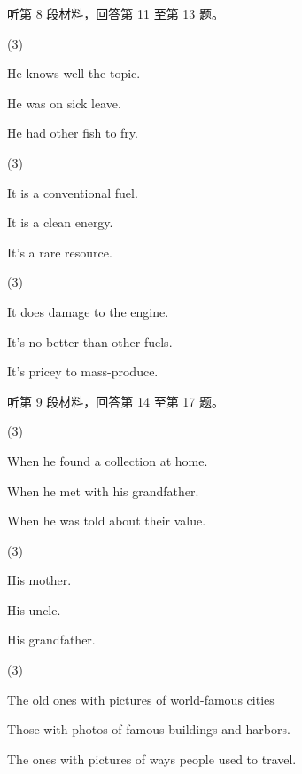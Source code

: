 \documentclass{英语试卷}
\begin{document}
\par 听第 8 段材料，回答第 11 至第 13 题。\par
{}
\begin{choices}(3)
  \item He knows well the topic.
  \item He was on sick leave.
  \item He had other fish to fry.
\end{choices}
\begin{choices}(3)
  \item It is a conventional fuel.
  \item It is a clean energy.
  \item It's a rare resource.
\end{choices}
\begin{choices}(3)
  \item It does damage to the engine.
  \item It's no better than other fuels.
  \item It's pricey to mass-produce.
\end{choices}
\par 听第 9 段材料，回答第 14 至第 17 题。\par
{}
\begin{choices}(3)
  \item When he found a collection at home.
  \item When he met with his grandfather.
  \item When he was told about their value.
\end{choices}
\begin{choices}(3)
  \item His mother.
  \item His uncle.
  \item His grandfather.
\end{choices}
\begin{choices}(3)
  \item The old ones with pictures of world-famous cities
  \item Those with photos of famous buildings and harbors.
  \item The ones with pictures of ways people used to travel.
\end{choices}
\end{document}
